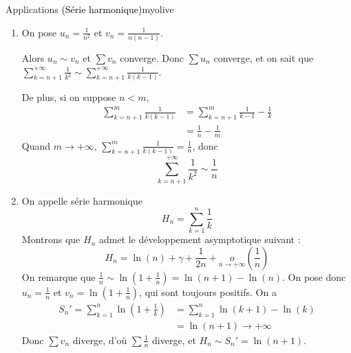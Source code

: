     \begin{omed}{Applications \textcolor{black}{(Série harmonique)}}{myolive}
        \begin{enumerate}
            \item On pose $u_n = \frac{1}{n^2}$ et $v_n = \frac{1}{n(n-1)}$. 
            
            Alors $u_n \sim v_n$ et $\sum v_n$ converge. Donc $\sum u_n$ converge, et on sait que $\sum_{k=n+1}^{+\infty} \frac{1}{k^2} \sim \sum_{k=n+1}^{+\infty} \frac{1}{k(k-1)}$.

            De plus, si on suppose $n < m$,
            \begin{align*}
                \sum_{k=n+1}^{m} \frac{1}{k(k-1)} &= \sum_{k=n+1}^{m} \frac{1}{k-1} - \frac{1}{k} \\
                &= \frac{1}{n} - \frac{1}{m} 
            \end{align*}
            Quand $m \rightarrow +\infty$, $\sum_{k=n+1}^{m} \frac{1}{k(k-1)} = \frac{1}{n}$, donc 
            \[ \sum_{k=n+1}^{+\infty} \frac{1}{k^2} \sim \frac{1}{n} \] 
            \item On appelle série harmonique
            \[ H_n = \sum_{k=1}^{n} \frac{1}{k} \] 
            Montrons que $H_n$ admet le développement asymptotique suivant :
            \[ H_n = \ln(n) + \gamma + \frac{1}{2n} + \underset{n \rightarrow + \infty}{o}(\frac{1}{n}) \] 
            On remarque que $\frac{1}{n} \sim \ln(1 + \frac{1}{n}) = \ln(n+1) - \ln(n)$. On pose donc $u_n = \frac{1}{n}$ et $v_n = \ln(1 + \frac{1}{n})$, qui sont toujours positifs. On a
            \begin{align*}
                S_n' = \sum_{k=1}^{n} \ln(1 + \frac{1}{k}) &= \sum_{k=1}^{n} \ln(k+1) - \ln(k) \\
                &= \ln(n+1) \rightarrow + \infty
            \end{align*} 
            Donc $\sum v_n$ diverge, d’où $\sum \frac{1}{n}$ diverge, et $H_n \sim S_n' = \ln(n+1)$. 


\end{enumerate}
\end{omed}

